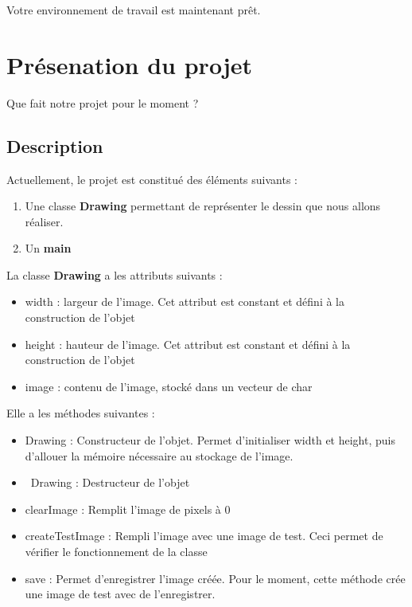 \documentclass[
	12pt, %
]{fphw}
\begin{document}
Votre environnement de travail est maintenant prêt.


\section*{Présenation du projet}

\begin{problem}
	Que fait notre projet pour le moment ?
\end{problem}


\subsection*{Description}

Actuellement, le projet est constitué des éléments suivants :
\begin{enumerate}
	\item Une classe \textbf{Drawing} permettant de représenter le dessin que nous allons réaliser.
	\item Un \textbf{main}
\end{enumerate}

La classe \textbf{Drawing} a les attributs suivants : \\
\begin{itemize}
	\item width : largeur de l'image. Cet attribut est constant et défini à la construction de l'objet
	\item height : hauteur de l'image. Cet attribut est constant et défini à la construction de l'objet
	\item image : contenu de l'image, stocké dans un vecteur de char
\end{itemize}

Elle a les méthodes suivantes : \\
\begin{itemize}
	\item Drawing : Constructeur de l'objet. Permet d'initialiser width et height, puis d'allouer la mémoire nécessaire au stockage de l'image.
	\item ~Drawing : Destructeur de l'objet
	\item clearImage : Remplit l'image de pixels à 0
	\item createTestImage : Rempli l'image avec une image de test. Ceci permet de vérifier le fonctionnement de la classe
	\item save : Permet d'enregistrer l'image créée. Pour le moment, cette méthode crée une image de test avec de l'enregistrer.
\end{itemize}
\end{document}
